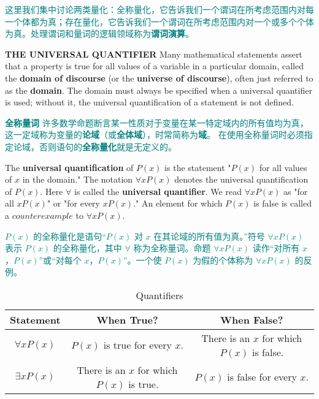 \documentclass[12pt, a4paper]{article} %
\begin{document}
\textcolor{teal}{
    这里我们集中讨论两类量化：全称量化，它告诉我们一个谓词在所考虑范围内对每一个体都为真；存在量化，它告诉我们一个谓词在所考虑范围内对一个或多个个体为真。处理谓词和量词的逻辑领域称为\textbf{谓词演算}。
}

\textbf{THE UNIVERSAL QUANTIFIER} Many mathematical statements assert that a property is true for all values of a variable in a particular domain, called the \textbf{domain of discourse} (or the \textbf{universe of discourse}), often just referred to as the \textbf{domain}.
The domain must always be specified when a universal quantifier is used; without it, the universal quantification of a statement is not defined.

\textcolor{teal}{
    \textbf{全称量词} 许多数学命题断言某一性质对于变量在某一特定域内的所有值均为真，这一定域称为变量的\textbf{论域}（或\textbf{全体域}），时常简称为\textbf{域}。
    在使用全称量词时必须指定论域，否则语句的\textbf{全称量化}就是无定义的。
}

\begin{definition}
    The \textbf{universal quantification} of $P(x)$ is the statement "$P(x)$ for all values of $x$ in the domain."
    The notation $\forall x P(x)$ denotes the universal quantification of $P(x)$. Here $\forall$ is called the \textbf{universal quantifier}. We read $\forall x P(x)$ as "for all $x P(x)$" or "for every $x P(x)$." An element for which $P(x)$ is false is called a $counterexample$ to $\forall x P(x)$.
\end{definition}

\begin{theorem}
    \textcolor{teal}{
        $P(x)$ 的全称量化是语句“$P(x)$ 对 $x$ 在其论域的所有值为真。”符号 $\forall x P(x)$ 表示 $P(x)$ 的全称量化，其中 $\forall$ 称为全称量词。命题 $\forall x P(x)$ 读作“对所有 $x$，$P(x)$”或“对每个 $x$，$P(x)$”。一个使 $P(x)$ 为假的个体称为 $\forall x P(x)$ 的反例。
    }
\end{theorem}

\begin{table}[H]
    \centering
    \caption{Quantifiers}
    \begin{tabular}{c|cc}
        \toprule
        Statement & When True? & When False? \\
        \midrule
        $\forall x P(x)$ & $P(x)$ is true for every $x$. & There is an $x$ for which $P(x)$ is false. \\
        $\exists x P(x)$ & There is an $x$ for which $P(x)$ is true. & $P(x)$ is false for every $x$. \\
        \bottomrule
    \end{tabular}%
    \label{tab:12}%
\end{table}%
\end{document}
